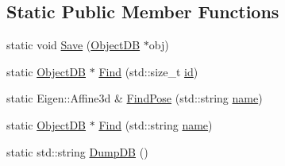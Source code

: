 \subsection*{Static Public Member Functions}
\begin{DoxyCompactItemize}
\item 
static void \hyperlink{structObjectDB_a444595d5d64fcfcf2a961e3f7735c317}{Save} (\hyperlink{structObjectDB}{Object\-D\-B} $\ast$obj)
\item 
static \hyperlink{structObjectDB}{Object\-D\-B} $\ast$ \hyperlink{structObjectDB_a0545684267bc54c7c2db6a5bd05e83af}{Find} (std\-::size\-\_\-t \hyperlink{structObjectDB_aab8a4b39fdbd287df00a9b38d1cae926}{id})
\item 
static Eigen\-::\-Affine3d \& \hyperlink{structObjectDB_a8cce5c93cb5984f63592e8462853d49a}{Find\-Pose} (std\-::string \hyperlink{structObjectDB_aac9d3fa047f7df1d8981fd3c6e97dd25}{name})
\item 
static \hyperlink{structObjectDB}{Object\-D\-B} $\ast$ \hyperlink{structObjectDB_aebc35a4364c0a693c68facb7e50eea67}{Find} (std\-::string \hyperlink{structObjectDB_aac9d3fa047f7df1d8981fd3c6e97dd25}{name})
\item 
static std\-::string \hyperlink{structObjectDB_a6b8e4cb3b57a314c21fdc9e51f0c2254}{Dump\-D\-B} ()
\end{DoxyCompactItemize}
